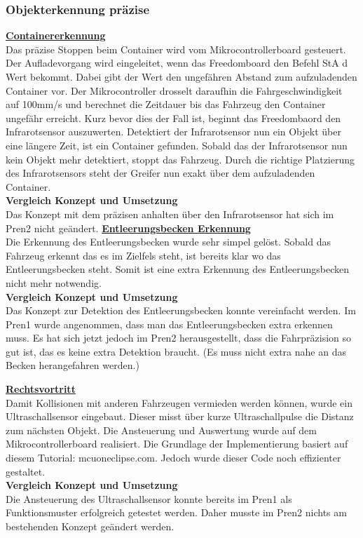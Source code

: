 \subsubsection{Objekterkennung präzise}
\underline{\textbf{Containererkennung}}\\[0.2cm]
Das präzise Stoppen beim Container wird vom Mikrocontrollerboard gesteuert. Der Aufladevorgang wird eingeleitet, wenn das Freedomboard den Befehl StA d Wert bekommt. Dabei gibt der Wert den ungefähren Abstand zum aufzuladenden Container vor. Der Mikrocontroller drosselt daraufhin die Fahrgeschwindigkeit auf 100mm/s und berechnet die Zeitdauer bis das Fahrzeug den Container ungefähr erreicht. Kurz bevor dies der Fall ist, beginnt das Freedombaord den Infrarotsensor auszuwerten. Detektiert der Infrarotsensor nun ein Objekt über eine längere Zeit, ist ein Container gefunden. Sobald das der Infrarotsensor nun kein Objekt mehr detektiert, stoppt das Fahrzeug. Durch die richtige Platzierung des Infrarotsensors steht der Greifer nun exakt über dem aufzuladenden Container.\\[0.2cm]
\textbf{Vergleich Konzept und Umsetzung}\\[0.2cm]
Das Konzept mit dem präzisen anhalten über den Infrarotsensor hat sich im Pren2 nicht geändert.
%
\underline{\textbf{Entleerungsbecken Erkennung}} \\[0.2cm]
Die Erkennung des Entleerungsbecken wurde sehr simpel gelöst. Sobald das Fahrzeug erkennt das es im Zielfels steht, ist bereits klar wo das Entleerungsbecken steht. Somit ist eine extra Erkennung des Entleerungsbecken nicht mehr notwendig.\\[0.2cm]
\textbf{Vergleich Konzept und Umsetzung}\\[0.2cm]
Das Konzept zur Detektion des Entleerungsbecken konnte vereinfacht werden. Im Pren1 wurde angenommen, dass man das Entleerungsbecken extra erkennen muss. Es hat sich jetzt jedoch im Pren2 herausgestellt, dass die Fahrpräzision so gut ist, das es keine extra Detektion braucht. (Es muss nicht extra nahe an das Becken herangefahren werden.)

\underline{\textbf{Rechtsvortritt}}\\[0.2cm]
Damit Kollisionen mit anderen Fahrzeugen vermieden werden können, wurde ein Ultraschallsensor eingebaut. Dieser misst über kurze Ultraschallpulse die Distanz zum nächsten Objekt. Die Ansteuerung und Auswertung wurde auf dem Mikrocontrollerboard realisiert. Die Grundlage der Implementierung basiert auf diesem Tutorial: mcuoneclipse.com. Jedoch wurde dieser Code noch effizienter gestaltet.\\[0.2cm]
\textbf{Vergleich Konzept und Umsetzung}\\[0.2cm]
Die Ansteuerung des Ultraschallsensor konnte bereits im Pren1 als Funktionsmuster erfolgreich getestet werden. Daher musste im Pren2 nichts am bestehenden Konzept geändert werden.